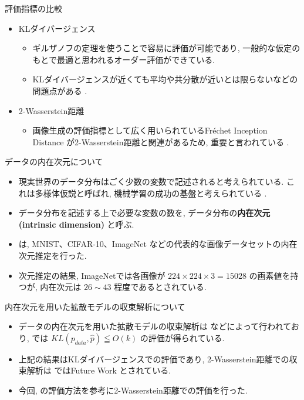 \documentclass[11pt]{beamer}
\theoremstyle{plain}
\theoremstyle{definition}
\renewcommand{\cite}[1]{\citep{#1}}
\begin{document}
  \begin{frame}{評価指標の比較}
    \begin{itemize}
        \item KLダイバージェンス
        \begin{itemize}
          \item ギルザノフの定理を使うことで容易に評価が可能であり, 一般的な仮定のもとで最適と思われるオーダー評価ができている.
          \item KLダイバージェンスが近くても平均や共分散が近いとは限らないなどの問題点がある \cite{beyler_bach_2025}.
        \end{itemize}
        \item 2-Wasserstein距離
        \begin{itemize}
          \item 画像生成の評価指標として広く用いられているFréchet Inception Distance \cite{heusel_et_al_2017} が2-Wasserstein距離と関連があるため, 重要と言われている \cite{arsenyan_vardanyan_dalalyan_2025}.
        \end{itemize}
    \end{itemize}
  \end{frame}
  \begin{frame}{データの内在次元について}
    \begin{itemize}
        \item 現実世界のデータ分布はごく少数の変数で記述されると考えられている. これは多様体仮説と呼ばれ, 機械学習の成功の基盤と考えられている \cite{pope_et_al_2021}.
        \item データ分布を記述する上で必要な変数の数を, データ分布の\textbf{内在次元 (intrinsic dimension)} と呼ぶ.
        \item \cite{pope_et_al_2021} は, MNIST、CIFAR-10、ImageNet などの代表的な画像データセットの内在次元推定を行った.
        \item 次元推定の結果, ImageNetでは各画像が $224\times 224 \times 3 = 15028$ の画素値を持つが, 内在次元は $26\sim 43$ 程度であるとされている.
    \end{itemize}
  \end{frame}
    \begin{frame}{内在次元を用いた拡散モデルの収束解析について}
    \begin{itemize}
        \item データの内在次元を用いた拡散モデルの収束解析は \cite{huang_wei_chen_2026,azangulov_deligiannidis_rousseau_2024,li_yan_2024_low_dimensional} などによって行われており, 
        \cite{huang_wei_chen_2026} では $KL(p_{data},\hat{p})\leqq O(k)$ の評価が得られている.
        \item 上記の結果はKLダイバージェンスでの評価であり, 2-Wasserstein距離での収束解析は \cite{huang_wei_chen_2026} ではFuture Work とされている.
        \item 今回, \cite{huang_wei_chen_2026} の評価方法を参考に2-Wasserstein距離での評価を行った.
    \end{itemize}
  \end{frame}
\end{document}
